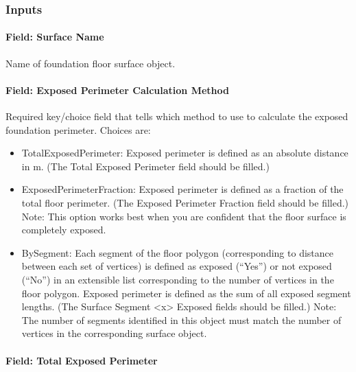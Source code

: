 \subsubsection{Inputs}\label{surfaceproperty-exposedfoundationperimeter-inputs}

\paragraph{Field: Surface Name}\label{surfaceproperty-exposedfoundationperimeter-surface-name}

Name of foundation floor surface object.

\paragraph{Field: Exposed Perimeter Calculation Method}\label{field-exposed-perimeter-calculation-method}

Required key/choice field that tells which method to use to calculate the exposed foundation perimeter. Choices are:

\begin{itemize}
\item TotalExposedPerimeter: Exposed perimeter is defined as an absolute distance in m. (The Total Exposed Perimeter field should be filled.)

\item ExposedPerimeterFraction: Exposed perimeter is defined as a fraction of the total floor perimeter. (The Exposed Perimeter Fraction field should be filled.) Note: This option works best when you are confident that the floor surface is completely exposed.

\item BySegment: Each segment of the floor polygon (corresponding to distance between each set of vertices) is defined as exposed (``Yes'') or not exposed (``No'') in an extensible list corresponding to the number of vertices in the floor polygon. Exposed perimeter is defined as the sum of all exposed segment lengths. (The Surface Segment \textless{}x\textgreater{}
Exposed fields should be filled.) Note: The number of segments identified in this object must match the number of vertices in the corresponding surface object.
\end{itemize}

\paragraph{Field: Total Exposed Perimeter}\label{surfaceproperty-exposedfoundationperimeter-total-exposed-perimeter}

